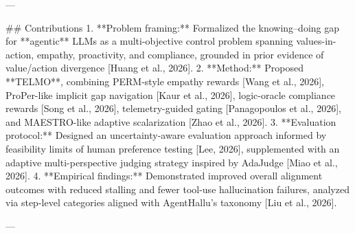 ---

## Contributions  
1. **Problem framing:** Formalized the knowing–doing gap for **agentic** LLMs as a multi-objective control problem spanning values-in-action, empathy, proactivity, and compliance, grounded in prior evidence of value/action divergence [Huang et al., 2026].  
2. **Method:** Proposed **TELMO**, combining PERM-style empathy rewards [Wang et al., 2026], ProPer-like implicit gap navigation [Kaur et al., 2026], logic-oracle compliance rewards [Song et al., 2026], telemetry-guided gating [Panagopoulos et al., 2026], and MAESTRO-like adaptive scalarization [Zhao et al., 2026].  
3. **Evaluation protocol:** Designed an uncertainty-aware evaluation approach informed by feasibility limits of human preference testing [Lee, 2026], supplemented with an adaptive multi-perspective judging strategy inspired by AdaJudge [Miao et al., 2026].  
4. **Empirical findings:** Demonstrated improved overall alignment outcomes with reduced stalling and fewer tool-use hallucination failures, analyzed via step-level categories aligned with AgentHallu’s taxonomy [Liu et al., 2026].

---